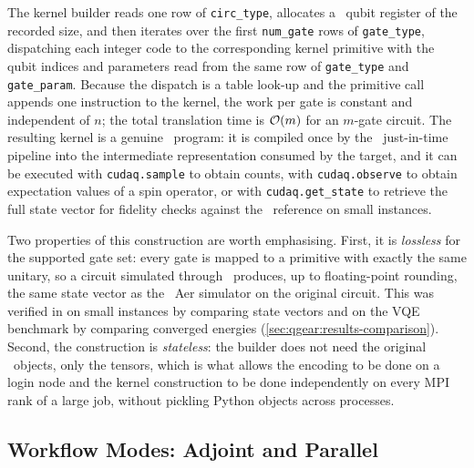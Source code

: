 The kernel builder reads one row of \texttt{circ\_type}, allocates a \cudaq\ qubit register of the recorded size, and then iterates over the first \texttt{num\_gate} rows of \texttt{gate\_type}, dispatching each integer code to the corresponding kernel primitive with the qubit indices and parameters read from the same row of \texttt{gate\_type} and \texttt{gate\_param}. Because the dispatch is a table look-up and the primitive call appends one instruction to the kernel, the work per gate is constant and independent of $n$; the total translation time is $\mathcal{O}\!\left(m\right)$ for an $m$-gate circuit. The resulting kernel is a genuine \cudaq\ program: it is compiled once by the \cudaq\ just-in-time pipeline into the intermediate representation consumed by the target, and it can be executed with \texttt{cudaq.sample} to obtain counts, with \texttt{cudaq.observe} to obtain expectation values of a spin operator, or with \texttt{cudaq.get\_state} to retrieve the full state vector for fidelity checks against the \qiskit\ reference on small instances.

Two properties of this construction are worth emphasising. First, it is \emph{lossless} for the supported gate set: every gate is mapped to a primitive with exactly the same unitary, so a circuit simulated through \qgear\ produces, up to floating-point rounding, the same state vector as the \qiskit\ Aer simulator on the original circuit. This was verified in \cite{guo2025qgear} on small instances by comparing state vectors and on the VQE benchmark by comparing converged energies (\cref{sec:qgear:results-comparison}). Second, the construction is \emph{stateless}: the builder does not need the original \qiskit\ objects, only the tensors, which is what allows the encoding to be done on a login node and the kernel construction to be done independently on every MPI rank of a large job, without pickling Python objects across processes.

\subsection{Workflow Modes: Adjoint and Parallel}\label{sec:qgear:modes}

